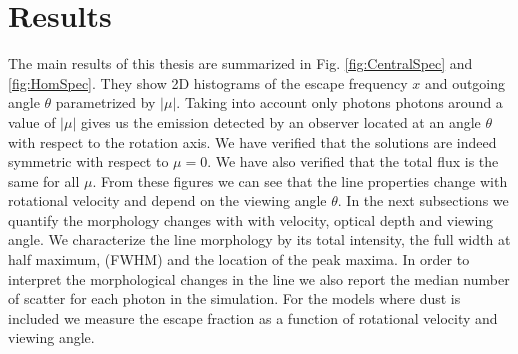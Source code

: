 
\chapter{Results} %

\label{sec:results} %


The main results of this thesis are summarized in Fig.
\ref{fig:CentralSpec} and \ref{fig:HomSpec}.
They show 2D histograms of the escape frequency $x$ and outgoing angle
$\theta$ parametrized by $|\mu|$.
Taking into account only photons photons around a value
of $|\mu|$ gives us the emission detected by an observer located at an
angle $\theta$ with respect to the rotation axis.
We have verified that the solutions are indeed symmetric with respect
to $\mu=0$. We have also verified that the total flux is the same for all $\mu$.
From these figures we can see that the line properties change with
rotational velocity and depend on the viewing angle $\theta$.
In the next subsections we quantify the morphology changes with with
velocity, optical depth and viewing angle.
We characterize the line morphology by its total intensity, the full
width at half maximum, (FWHM) and the location of the peak maxima.
In order to interpret the
morphological changes in the line we also report the median number of
scatter for each \ly photon in the simulation.
For the models where dust is included we measure the escape fraction
as a function of rotational velocity and viewing angle.
